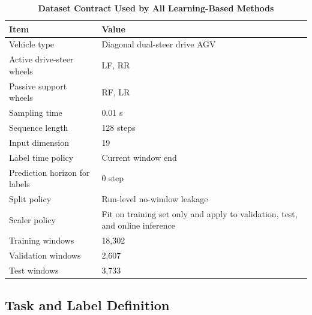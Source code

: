 \documentclass{ieeeaccess}
\begin{document}
\begin{table}[!t]

\caption{\textbf{Dataset Contract Used by All Learning-Based Methods}}

\label{tab:dataset_contract}

\setlength{\tabcolsep}{3pt}

\begin{tabular}{|p{108pt}|p{130pt}|}

\hline

Item & Value \\

\hline

Vehicle type & Diagonal dual-steer drive AGV \\

Active drive-steer wheels & LF, RR \\

Passive support wheels & RF, LR \\

Sampling time & 0.01 s \\

Sequence length & 128 steps \\

Input dimension & 19 \\

Label time policy & Current window end \\

Prediction horizon for labels & 0 step \\

Split policy & Run-level no-window leakage \\

Scaler policy & Fit on training set only and apply to validation, test, and online inference \\

Training windows & 18,302 \\

Validation windows & 2,607 \\

Test windows & 3,733 \\

\hline

\end{tabular}

\end{table}

\subsection{Task and Label Definition}
\end{document}
